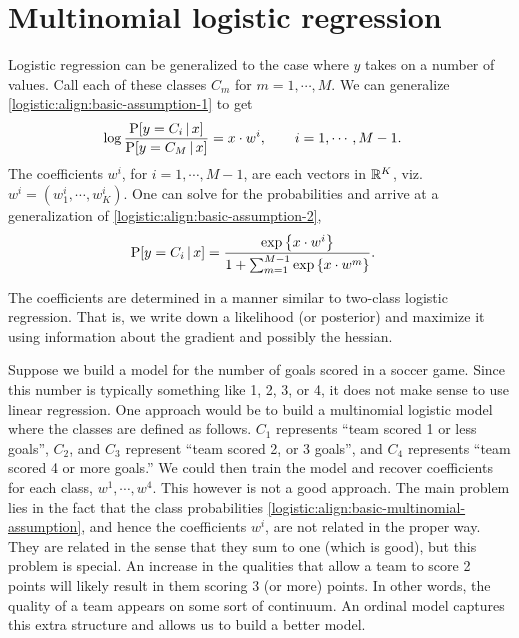 \section{Multinomial logistic regression}
\label{logistic:section:multinomial}
Logistic regression can be generalized to the case where $y$ takes on a number of values.  Call each of these classes $C_m$ for $m=1,\cdots,M$.  We can generalize \eqref{logistic:align:basic-assumption-1} to get
\begin{align*}
  \log\frac{\mathrm{P}[y=C_i{\,|\,} x]}{\mathrm{P}[y=C_M{\,|\,} x]} &= x\cdot w^i,\qquad i = 1,\cdots,M-1.
\end{align*}
The coefficients $w^i$, for $i=1,\cdots,M-1$, are each vectors in ${\mathbb R}^K$, viz. $w^i=(w^i_1,\cdots,w^i_K)$.  One can solve for the probabilities and arrive at a generalization of \eqref{logistic:align:basic-assumption-2},
\begin{align}
  \label{logistic:align:basic-multinomial-assumption}
  \mathrm{P}[y=C_i{\,|\,} x] &= \frac{\exp\left\{ x\cdot w^i \right\}}{1 + \sum_{m=1}^{M-1}\exp\left\{x\cdot w^m\right\}}.
\end{align}

The coefficients are determined in a manner similar to two-class logistic regression.  That is, we write down a likelihood (or posterior) and maximize it using information about the gradient and possibly the hessian.

\begin{digression*}
  Suppose we build a model for the number of goals scored in a soccer game.  Since this number is typically something like 1, 2, 3, or 4, it does not make sense to use linear regression.  One approach would be to build a multinomial logistic model where the classes are defined as follows.  $C_1$ represents ``team scored 1 or less goals'', $C_2$, and $C_3$ represent ``team scored 2, or 3 goals'', and $C_4$ represents ``team scored 4 or more goals.''  We could then train the model and recover coefficients for each class, $w^1,\cdots,w^4$.  This however is not a good approach.  The main problem lies in the fact that the class probabilities \eqref{logistic:align:basic-multinomial-assumption}, and hence the coefficients $w^i$, are not related in the proper way.  They are related in the sense that they sum to one (which is good), but this problem is special.  An increase in the qualities that allow a team to score 2 points will likely result in them scoring 3 (or more) points.  In other words, the quality of a team appears on some sort of continuum.  An ordinal model captures this extra structure and allows us to build a better model.
\end{digression*}

